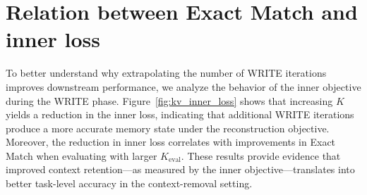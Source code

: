 \documentclass{article}
\theoremstyle{plain}
\theoremstyle{definition}
\theoremstyle{remark}
\begin{document}
{%









\section{Relation between Exact Match and inner loss}
\label{sec:em-ce_relation}

To better understand why extrapolating the number of WRITE iterations improves downstream performance, we analyze the behavior of the inner objective during the WRITE phase. Figure~\ref{fig:kv_inner_loss} shows that increasing $K$ yields a reduction in the inner loss, indicating that additional WRITE iterations produce a more accurate memory state under the reconstruction objective. Moreover, the reduction in inner loss correlates with improvements in Exact Match when evaluating with larger $K_{\text{eval}}$. These results provide evidence that improved context retention---as measured by the inner objective---translates into better task-level accuracy in the context-removal setting.

}
\end{document}
